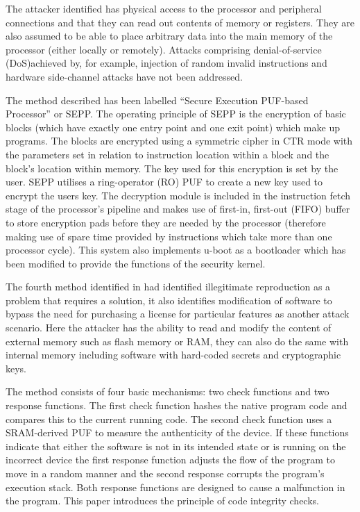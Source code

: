 The attacker identified has physical access to the processor and peripheral connections and that they can read out contents of memory or registers. They are also assumed to be able to place arbitrary data into the main memory of the processor (either locally or remotely). Attacks comprising denial-of-service (DoS)achieved by, for example, injection of random invalid instructions and hardware side-channel attacks have not been addressed.

The method described has been labelled ``Secure Execution PUF-based Processor'' or SEPP. The operating principle of SEPP is the encryption of basic blocks (which have exactly one entry point and one exit point) which make up programs. The blocks are encrypted using a symmetric cipher in CTR mode with the parameters set in relation to instruction location within a block and the block's location within memory. The key used for this encryption is set by the user. SEPP utilises a ring-operator (RO) PUF to create a new key used to encrypt the users key.  The decryption module is included in the instruction fetch stage of the processor's pipeline and makes use of first-in, first-out (FIFO) buffer to store encryption pads before they are needed by the processor (therefore making use of spare time provided by instructions which take more than one processor cycle). This system also implements u-boot as a bootloader which has been modified to provide the functions of the security kernel. 


The fourth method identified in \cite{Kohnhauser2015} had identified illegitimate reproduction as a problem that requires a solution, it also identifies modification of software to bypass the need for purchasing a license for particular features as another attack scenario. Here the attacker has the ability to read and modify the content of external memory such as flash memory or RAM, they can also do the same with internal memory including software with hard-coded secrets and cryptographic keys.

The method consists of four basic mechanisms: two check functions and two response functions. The first check function hashes the native program code and compares this to the current running code. The second check function uses a SRAM-derived PUF to measure the authenticity of the device. If these functions indicate that either the software is not in its intended state or is running on the incorrect device the first response function adjusts the flow of the program to move in a random manner  and the second response corrupts the program's execution stack. Both response functions are designed to cause a malfunction in the program. This paper introduces the principle of code integrity checks.


